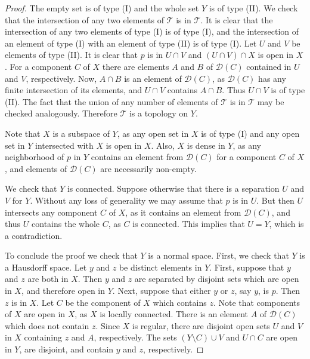 \documentclass{amsart}
\newenvironment{proof of claim}{\noindent\textbf{Proof of the claim.}}{\hfill{$\square$}\newline}
\theoremstyle{definition}
\theoremstyle{remark}
\numberwithin{equation}{section}
\begin{document}
\begin{proof}
The empty set is of type (I) and the whole set $Y$ is of type (II). We check that the intersection of any two elements of $\mathscr{T}$ is in $\mathscr{T}$. It is clear that the intersection of any two elements of type (I) is of type (I), and the intersection of an element of type (I) with an element of type (II) is of type (I). Let $U$ and $V$ be elements of type (II). It is clear that $p$ is in $U\cap V$ and $(U\cap V)\cap X$ is open in $X$. For a component $C$ of $X$ there are elements $A$ and $B$ of $\mathscr{D}(C)$ contained in $U$ and $V$, respectively. Now, $A\cap B$ is an element of $\mathscr{D}(C)$, as $\mathscr{D}(C)$ has any finite intersection of its elements, and $U\cap V$ contains $A\cap B$. Thus $U\cap V$ is of type (II). The fact that the union of any number of elements of $\mathscr{T}$ is in $\mathscr{T}$ may be checked analogously. Therefore $\mathscr{T}$ is a topology on $Y$.

Note that $X$ is a subspace of $Y$, as any open set in $X$ is of type (I) and any open set in $Y$ intersected with $X$ is open in $X$. Also, $X$ is dense in $Y$, as any neighborhood of $p$ in $Y$ contains an element from $\mathscr{D}(C)$ for a component $C$ of $X$, and elements of $\mathscr{D}(C)$ are necessarily non-empty.

We check that $Y$ is connected. Suppose otherwise that there is a separation $U$ and $V$ for $Y$. Without any loss of generality we may assume that $p$ is in $U$. But then $U$ intersects any component $C$ of $X$, as it contains an element from $\mathscr{D}(C)$, and thus $U$ contains the whole $C$, as $C$ is connected. This implies that $U=Y$, which is a contradiction.

To conclude the proof we check that $Y$ is a normal space. First, we check that $Y$ is a Hausdorff space. Let $y$ and $z$ be distinct elements in $Y$. First, suppose that $y$ and $z$ are both in $X$. Then $y$ and $z$ are separated by disjoint sets which are open in $X$, and therefore open in $Y$. Next, suppose that either $y$ or $z$, say $y$, is $p$. Then $z$ is in $X$. Let $C$ be the component of $X$ which contains $z$. Note that components of $X$ are open in $X$, as $X$ is locally connected. There is an element $A$ of $\mathscr{D}(C)$ which does not contain $z$. Since $X$ is regular, there are disjoint open sets $U$ and $V$ in $X$ containing $z$ and $A$, respectively. The sets $(Y\setminus C)\cup V$ and $U\cap C$ are open in $Y$, are disjoint, and contain $y$ and $z$, respectively.


\end{proof}
\end{document}
